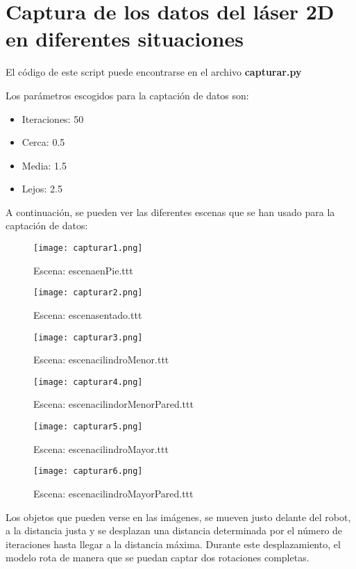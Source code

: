\newpage

\section{Captura de los datos del láser 2D en diferentes situaciones}

El código de este script puede encontrarse en el archivo \textbf{capturar.py}

Los parámetros escogidos para la captación de datos son:
\begin{itemize}
	\item Iteraciones: 50
	\item Cerca: 0.5
	\item Media: 1.5
	\item Lejos: 2.5
\end{itemize}

A continuación, se pueden ver las diferentes escenas que se han usado para la captación de datos:

\begin{figure}[H]
	\centering
	\texttt{[image: capturar1.png]}
	\caption{Escena: escenaenPie.ttt}
\end{figure}
\begin{figure}[H]
	\centering
	\texttt{[image: capturar2.png]}
	\caption{Escena: escenasentado.ttt}
\end{figure}
\begin{figure}[H]
	\centering
	\texttt{[image: capturar3.png]}
	\caption{Escena: escenacilindroMenor.ttt}
\end{figure}
\begin{figure}[H]
	\centering
	\texttt{[image: capturar4.png]}
	\caption{Escena: escenacilindorMenorPared.ttt}
\end{figure}
\begin{figure}[H]
	\centering
	\texttt{[image: capturar5.png]}
	\caption{Escena: escenacilindroMayor.ttt}
\end{figure}
\begin{figure}[H]
	\centering
	\texttt{[image: capturar6.png]}
	\caption{Escena: escenacilindroMayorPared.ttt}
\end{figure}

Los objetos que pueden verse en las imágenes, se mueven justo delante del robot, a la distancia justa y se desplazan una distancia determinada por el número de iteraciones hasta llegar a la distancia máxima. Durante este desplazamiento, el modelo rota de manera que se puedan captar dos rotaciones completas.

